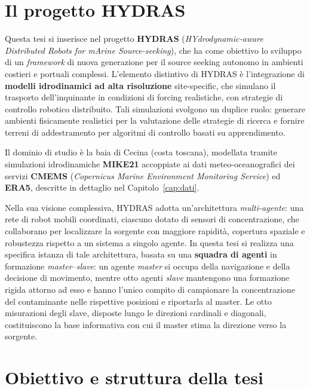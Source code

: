 \section{Il progetto HYDRAS}

Questa tesi si inserisce nel progetto \textbf{HYDRAS} (\emph{HYdrodynamic-aware
Distributed Robots for mArine Source-seeking}), che ha come obiettivo lo sviluppo di un
\emph{framework} di nuova generazione per il source seeking autonomo in ambienti costieri
e portuali complessi. L'elemento distintivo di HYDRAS \`e l'integrazione di
\textbf{modelli idrodinamici ad alta risoluzione} site-specific, che simulano il
trasporto dell'inquinante in condizioni di forcing realistiche, con strategie di
controllo robotico distribuito. Tali simulazioni svolgono un duplice ruolo: generare
ambienti fisicamente realistici per la valutazione delle strategie di ricerca e fornire
terreni di addestramento per algoritmi di controllo basati su apprendimento.

Il dominio di studio \`e la baia di Cecina (costa toscana), modellata tramite
simulazioni idrodinamiche \textbf{MIKE21} accoppiate ai dati meteo-oceanografici dei
servizi \textbf{CMEMS} (\emph{Copernicus Marine Environment Monitoring Service}) ed
\textbf{ERA5}, descritte in dettaglio nel Capitolo~\ref{cap:dati}.

Nella sua visione complessiva, HYDRAS adotta un'architettura \emph{multi-agente}: una
rete di robot mobili coordinati, ciascuno dotato di sensori di concentrazione, che
collaborano per localizzare la sorgente con maggiore rapidit\`a, copertura spaziale e
robustezza rispetto a un sistema a singolo agente. In questa tesi si realizza una
specifica istanza di tale architettura, basata su una \textbf{squadra di agenti} in
formazione \emph{master--slave}: un agente \emph{master} si occupa della navigazione e
della decisione di movimento, mentre otto agenti \emph{slave} mantengono una formazione
rigida attorno ad esso e hanno l'unico compito di campionare la concentrazione del
contaminante nelle rispettive posizioni e riportarla al master. Le otto misurazioni
degli slave, disposte lungo le direzioni cardinali e diagonali, costituiscono la base
informativa con cui il master stima la direzione verso la sorgente.

\section{Obiettivo e struttura della tesi}

